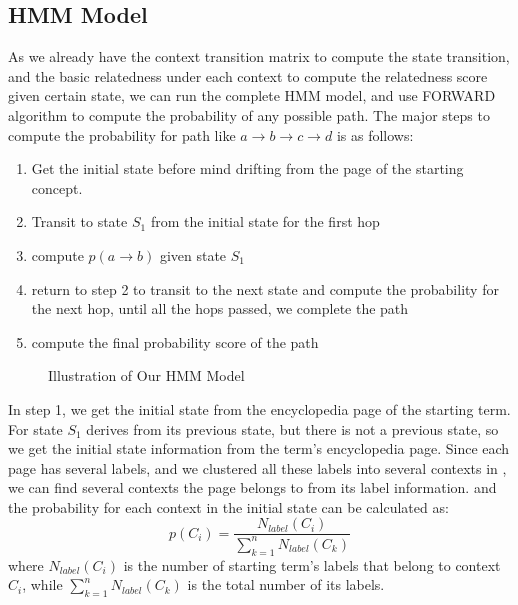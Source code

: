 \subsection{HMM Model}
As we already have the context transition matrix to compute 
the state transition, and the basic relatedness under each context 
to compute the relatedness score given
certain state, we can run the complete HMM model, and use FORWARD algorithm 
\cite{} to compute the probability of any possible path. 
The major steps to compute the probability
for path like $a\rightarrow b\rightarrow c\rightarrow d$ is as follows:

\begin{enumerate}
\item Get the initial state before mind drifting from the page
of the starting concept.
\item Transit to state $S_1$ from the initial state for the first hop
\item compute $p(a\rightarrow b)$ given state $S_1$
\item return to step 2 to transit to the next state and compute
the probability for the next hop, until all the hops passed, we
complete the path
\item compute the final probability score of the path
\end{enumerate}

\begin{figure}[th]
\centering
\shrink
{}
\caption{Illustration of Our HMM Model}
\label{fig:hmm}
\shrink
\end{figure}

In step 1, we get the initial state from the encyclopedia page of the
starting term. For state $S_1$ derives from its previous state, but there is
not a previous state, so we get the initial state information from the term's
encyclopedia page. Since each page has several labels, 
and we clustered all these
labels into several contexts in , 
we can find several contexts the page belongs to from its label information. 
and the probability for each context in the initial state can 
be calculated as:
\begin{equation}
p(C_i)=\frac{N_{label}(C_i)}{\sum_{k=1}^nN_{label}(C_k)}
\end{equation}
where $N_{label}(C_i)$ is the number of starting term's labels that belong to context $C_i$,
while $\sum_{k=1}^nN_{label}(C_k)$ is the total number of its labels.

